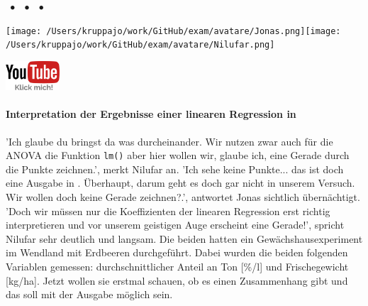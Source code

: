 \documentclass[a4paper, 9pt]{scrartcl}\usepackage[]{graphicx}\usepackage[]{xcolor}
\begin{document}
 
\ifcollection
\begin{flushright}
\tiny\vspace{-3Ex}
\textbf{\examinhaltstart}
\exammodulestat $\;\bullet$
\exammodulestatbbv $\;\bullet$
\exammodulestatversuch $\;\bullet$
\exammodulebiostat
\vspace{-4Ex}
\end{flushright}
\begin{minipage}[t]{0.5\textwidth}
\texttt{[image: /Users/kruppajo/work/GitHub/exam/avatare/Jonas.png]}\hspace{-4mm}\texttt{[image: /Users/kruppajo/work/GitHub/exam/avatare/Nilufar.png]}
\end{minipage}
\begin{minipage}[t]{0.5\textwidth}
\hfill
\href{https://youtu.be/tNNzcndrpSk}{\includegraphics[width = 2cm]{img/youtube}}
\end{minipage}
\fi



\ifcollection
\paragraph{Interpretation der Ergebnisse einer linearen Regression in \Rlogo}
\fi

'Ich glaube du bringst da was durcheinander. Wir nutzen zwar auch für die ANOVA die Funktion \texttt{lm()} aber hier wollen wir, glaube ich, eine Gerade durch die Punkte zeichnen.', merkt Nilufar an. 'Ich sehe keine Punkte... das ist doch eine Ausgabe in \Rlogo. Überhaupt, darum geht es doch gar nicht in unserem Versuch. Wir wollen doch keine Gerade zeichnen?.', antwortet Jonas sichtlich übernächtigt. 'Doch wir müssen nur die Koeffizienten der linearen Regression erst richtig interpretieren und vor unserem geistigen Auge erscheint eine Gerade!', spricht Nilufar sehr deutlich und langsam. Die beiden hatten ein Gewächshausexperiment im Wendland mit Erdbeeren durchgeführt. Dabei wurden die beiden folgenden Variablen gemessen: durchschnittlicher Anteil an Ton [\%/l] und Frischegewicht [kg/ha]. Jetzt wollen sie erstmal schauen, ob es einen Zusammenhang gibt und das soll mit der \Rlogo Ausgabe möglich sein.
\end{document}
